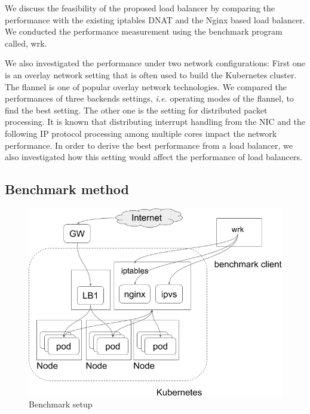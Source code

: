 We discuss the feasibility of the proposed load balancer by comparing the performance with the existing iptables DNAT and the Nginx based load balancer. 
We conducted the performance measurement using the benchmark program called, wrk\cite{Glozer2016}.

We also investigated the performance under two network configurations: 
First one is an overlay network setting\cite{Sill2016,Marmol2015} that is often used to build the Kubernetes cluster. 
The flannel\cite{CoreOSFlannel} is one of popular overlay network technologies. 
We compared the performances of three backends settings\cite{CoreOSFlannelBackend}, 
{\it i.e.} operating modes of the flannel, to find the best setting.
The other one is the setting for distributed packet processing.
It is known that distributing interrupt handling from the NIC and the following IP protocol processing 
among multiple cores impact the network performance.
In order to derive the best performance from a load balancer, 
we also investigated how this setting would affect the performance of load balancers.


\subsection{Benchmark method}

\begin{figure}
\includegraphics[width=\columnwidth]{Figs/benchmark-schem}
\caption{Benchmark setup}
\label{fig:benchmark-schem}
\end{figure}

